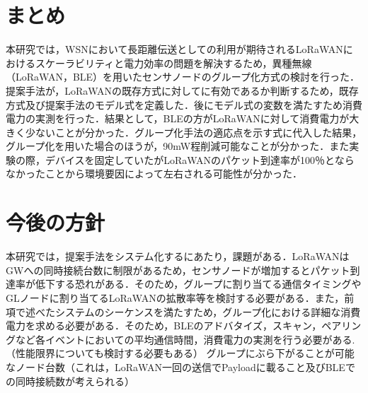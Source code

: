 \section{まとめ}
本研究では，WSNにおいて長距離伝送としての利用が期待されるLoRaWANにおけるスケーラビリティと電力効率の問題を解決するため，異種無線（LoRaWAN，BLE）を用いたセンサノードのグループ化方式の検討を行った．提案手法が，LoRaWANの既存方式に対してに有効であるか判断するため，既存方式及び提案手法のモデル式を定義した．後にモデル式の変数を満たすため消費電力の実測を行った．結果として，BLEの方がLoRaWANに対して消費電力が大きく少ないことが分かった．グループ化手法の適応点を示す式に代入した結果，グループ化を用いた場合のほうが，90mW程削減可能なことが分かった．また実験の際，デバイスを固定していたがLoRaWANのパケット到達率が100％とならなかったことから環境要因によって左右される可能性が分かった．
\par

\section{今後の方針}
本研究では，提案手法をシステム化するにあたり，課題がある．LoRaWANはGWへの同時接続台数に制限があるため，センサノードが増加するとパケット到達率が低下する恐れがある．そのため，グループに割り当てる通信タイミングやGLノードに割り当てるLoRaWANの拡散率等を検討する必要がある．また，前項で述べたシステムのシーケンスを満たすため，グループ化における詳細な消費電力を求める必要がある．そのため，BLEのアドバタイズ，スキャン，ペアリングなど各イベントにおいての平均通信時間，消費電力の実測を行う必要がある.
（性能限界についても検討する必要もある）
グループにぶら下がることが可能なノード台数（これは，LoRaWAN一回の送信でPayloadに載ること及びBLEでの同時接続数が考えられる）